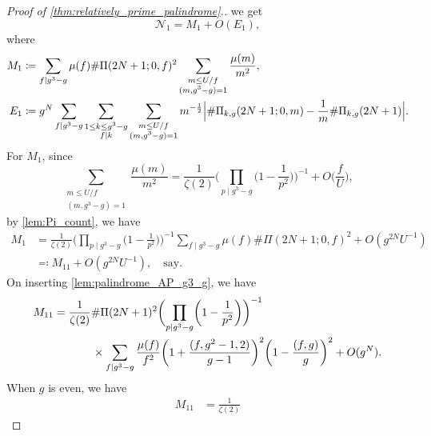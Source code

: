 \documentclass{amsart}
\theoremstyle{plain}
\theoremstyle{definition}
\begin{document}
\begin{proof}[Proof of \cref{thm:relatively_prime_palindrome}.]
we get
\begin{equation}
\label{thm:relatively_prime_palindrome:N1:M1_E1}
\mathscr{N}_{1}
=
M_{1}+O(E_{1}),
\end{equation}
where
\begin{align}
M_{1}
&\coloneqq
\sum_{f\mid g^{3}-g}
\mu(f)
\#\Pi(2N+1;0,f)^{2}
\sum_{\substack{
m\le U/f\\
(m,g^{3}-g)=1
}}
\frac{\mu(m)}{m^{2}},\\
E_{1}
&\coloneqq
g^{N}
\sum_{f\mid g^{3}-g}
\sum_{\substack{
1\le k\le g^{3}-g\\
f\mid k
}}
\sum_{\substack{
m\le U/f\\
(m,g^{3}-g)=1
}}
m^{-\frac{1}{2}}
\Bigl|
\#\Pi_{k,g}(2N+1;0,m)
-
\frac{1}{m}
\#\Pi_{k,g}(2N+1)
\Bigr|.
\end{align}
For $M_{1}$, since
\[
\sum_{\substack{
m\le U/f\\
(m,g^{3}-g)=1
}}
\frac{\mu(m)}{m^{2}}
=
\frac{1}{\zeta(2)}
\biggl(\prod_{p\mid g^{3}-g}\biggl(1-\frac{1}{p^{2}}\biggr)\biggr)^{-1}
+
O\biggl(\frac{f}{U}\biggr),
\]
by \cref{lem:Pi_count}, we have
\begin{equation}
\label{thm:relatively_prime_palindrome:N1:M1:after_inner_sum}
\begin{aligned}
M_{1}
&=
\frac{1}{\zeta(2)}
\biggl(\prod_{p\mid g^{3}-g}\biggl(1-\frac{1}{p^{2}}\biggr)\biggr)^{-1}
\sum_{f\mid g^{3}-g}
\mu(f)
\#\Pi(2N+1;0,f)^{2}
+
O(g^{2N}U^{-1})\\
&\eqqcolon
M_{11}
+
O(g^{2N}U^{-1}),\quad\text{say}.
\end{aligned}
\end{equation}
On inserting \cref{lem:palindrome_AP_g3_g}, we have
\begin{equation}
\label{thm:relatively_prime_palindrome:N1:M11:after_inner_sum}
\begin{aligned}
M_{11}
&=
\frac{1}{\zeta(2)}
\#\Pi(2N+1)^{2}
\biggl(\prod_{p\mid g^{3}-g}\biggl(1-\frac{1}{p^{2}}\biggr)\biggr)^{-1}\\
&\hspace{0.1\textwidth}
\times
\sum_{f\mid g^{3}-g}
\frac{\mu(f)}{f^{2}}
\biggl(1+\frac{(f,g^{2}-1,2)}{g-1}\biggr)^{2}
\biggl(1-\frac{(f,g)}{g}\biggr)^{2}
+
O(g^{N}).
\end{aligned}
\end{equation}
When $g$ is even, we have
\begin{equation}
\label{thm:relatively_prime_palindrome:N1:M11:after_inner_sum_even}
\begin{aligned}
M_{11}
&=
\frac{1}{\zeta(2)}

\end{aligned}
\end{equation}
\end{proof}
\end{document}
